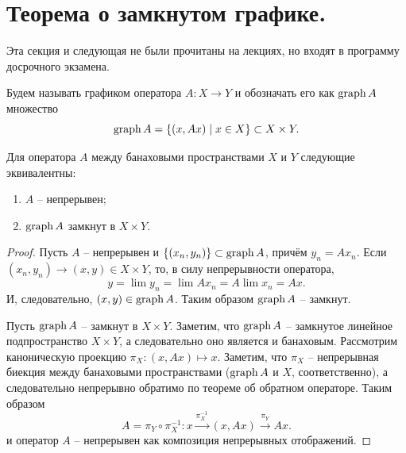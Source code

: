 \section{Теорема о замкнутом графике.}
\begin{notet}
    Эта секция и следующая не были прочитаны на лекциях, но входят в программу досрочного экзамена.
\end{notet}
\begin{definition}
    Будем называть графиком оператора $A\colon X \to Y$ и обозначать его как $\operatorname{graph} A$ множество
    \[
        \operatorname{graph} A = \{(x, Ax) \mid x \in X\} \subset X \times Y.
    \]
\end{definition}
\begin{theorem}
    Для оператора $A$ между банаховыми пространствами $X$ и $Y$ следующие эквивалентны:
    \begin{enumerate}
        \item $A$ -- непрерывен;
        \item $\operatorname{graph} A$ замкнут в $X \times Y$.
    \end{enumerate}
\end{theorem}
\begin{proof}
    Пусть $A$ -- непрерывен и $\{(x_n, y_n)\} \subset \operatorname{graph} A$, причём $y_n = Ax_n$.
    Если $(x_n, y_n) \rightarrow (x, y) \in X \times Y$, то, в силу непрерывности оператора,
    \[
        y = \lim y_n = \lim A x_n = A \lim x_n = Ax.
    \]
    И, следовательно, $(x, y) \in \operatorname{graph} A$.
    Таким образом $\operatorname{graph} A$ -- замкнут.

    Пусть $\operatorname{graph} A$ -- замкнут в $X \times Y$.
    Заметим, что $\operatorname{graph} A$ -- замкнутое линейное подпространство $X \times Y$, а следовательно оно является и банаховым.
    Рассмотрим каноническую проекцию $\pi_X\colon (x, Ax) \mapsto x$.
    Заметим, что $\pi_X$ -- непрерывная биекция между банаховыми пространствами ($\operatorname{graph} A$ и $X$, соответственно), а следовательно непрерывно обратимо по теореме об обратном операторе.
    Таким образом
    \[
        A = \pi_Y \circ \pi^{-1}_X: x \xrightarrow{\pi^{-1}_X} (x, Ax) \xrightarrow{\pi_Y} Ax.
    \]
    и оператор $A$ -- непрерывен как композиция непрерывных отображений.
\end{proof}
